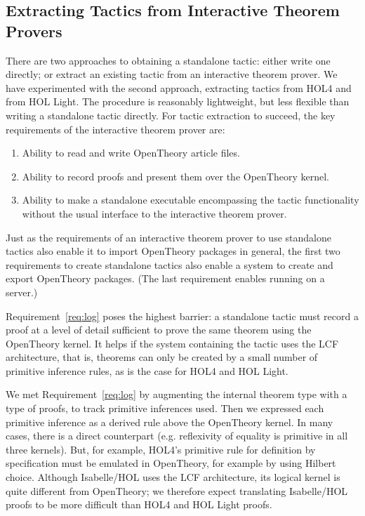 \documentclass{llncs}
\newcommand{\OpenTheory}{OpenTheory\xspace}
\newcommand{\eg}{e.g.\xspace}
\begin{document}
\subsection{Extracting Tactics from Interactive Theorem Provers}

There are two approaches to obtaining a standalone tactic: either write one directly; or extract an existing tactic from an interactive theorem prover.
We have experimented with the second approach, extracting tactics from HOL4 and from HOL Light.
The procedure is reasonably lightweight, but less flexible than writing a standalone tactic directly.
For tactic extraction to succeed, the key requirements of the interactive theorem prover are:
\begin{enumerate}
\item\label{req:io} Ability to read and write \OpenTheory article files.

\item\label{req:log} Ability to record proofs and present them over the \OpenTheory kernel.

\item\label{req:ckpt} Ability to make a standalone executable encompassing the tactic functionality without the usual interface to the interactive theorem prover.
\end{enumerate}

Just as the requirements of an interactive theorem prover to use standalone tactics also enable it to import \OpenTheory packages in general, the first two requirements to create standalone tactics also enable a system to create and export \OpenTheory packages.
(The last requirement enables running on a server.)

Requirement~\ref{req:log} poses the highest barrier: a standalone tactic must record a proof at a level of detail sufficient to prove the same theorem using the \OpenTheory kernel.
It helps if the system containing the tactic uses the LCF architecture, that is, theorems can only be created by a small number of primitive inference rules, as is the case for HOL4 and HOL Light.

We met Requirement~\ref{req:log} by augmenting the internal theorem type with a type of proofs, to track primitive inferences used.
Then we expressed each primitive inference as a derived rule above the \OpenTheory kernel.
In many cases, there is a direct counterpart (\eg reflexivity of equality is primitive in all three kernels).
But, for example, HOL4's primitive rule for definition by specification must be emulated in \OpenTheory, for example by using Hilbert choice.
Although Isabelle/HOL uses the LCF architecture, its logical kernel is quite different from \OpenTheory; we therefore expect translating Isabelle/HOL proofs to be more difficult than HOL4 and HOL Light proofs.
\end{document}
